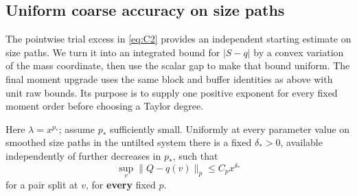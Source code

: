 \subsection{Uniform coarse accuracy on size paths}
The pointwise trial excess in \eqref{eq:C2} provides an independent
starting estimate on size paths. We turn it into an integrated bound
for $|S-q|$ by a convex variation of the mass coordinate, then use the
scalar gap to make that bound uniform. The final moment upgrade uses
the same block and buffer identities as above with unit raw bounds.
Its purpose is to supply one positive exponent for every fixed moment
order before choosing a Taylor degree.

\begin{proposition}\label{prop:statistics-size-accuracy}

Here \(\lambda=x^{p_*}\); assume \(p_*\) sufficiently small. Uniformly at every parameter value on smoothed size paths in the untilted system there is a fixed \(\delta_*>0\), available independently of further decreases in \(p_*\), such that
\begin{equation}
\sup_v\|Q-q(v)\|_p\le C_p x^{\delta_*}                  \tag{D11}\label{eq:D11}
\end{equation}
for a pair split at \(v\), for \textbf{every} fixed \(p\). \end{proposition}
